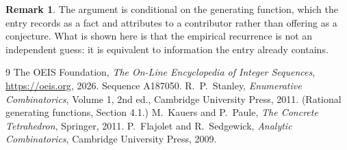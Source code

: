 \documentclass[11pt,a4paper]{article}
\theoremstyle{plain}
\theoremstyle{definition}
\newtheorem{remark}[theorem]{Remark}
\begin{document}
\begin{remark}
The argument is conditional on the generating function, which the entry records as a fact and
attributes to a contributor rather than offering as a conjecture. What is shown here is that
the empirical recurrence is not an independent guess: it is equivalent to information the
entry already contains.
\end{remark}

\begin{thebibliography}{9}
 The OEIS Foundation, \emph{The On-Line Encyclopedia of Integer
Sequences}, \url{https://oeis.org}, 2026. Sequence A187050.
 R.~P.~Stanley, \emph{Enumerative Combinatorics}, Volume 1, 2nd ed.,
Cambridge University Press, 2011. (Rational generating functions, Section 4.1.)
 M.~Kauers and P.~Paule, \emph{The Concrete Tetrahedron}, Springer, 2011.
 P.~Flajolet and R.~Sedgewick, \emph{Analytic Combinatorics}, Cambridge
University Press, 2009.
\end{thebibliography}
\end{document}

